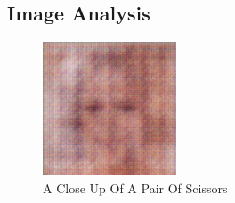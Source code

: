 \documentclass{article}%
\begin{document}
%
\subsection{Image Analysis}%
\label{subsec:ImageAnalysis}%


\begin{figure}[h!]%
\centering%
\includegraphics[width=150px]{500_fake_images/samples_5_452.png}%
\caption{A Close Up Of A Pair Of Scissors}%
\end{figure}

%
\end{document}
